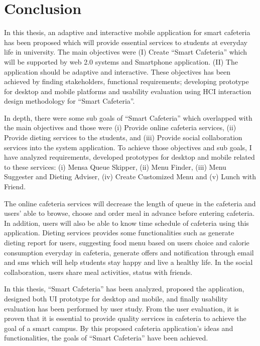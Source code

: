 \chapter{Conclusion}
\label{chap:Conclusion}
In this thesis, an adaptive and interactive mobile application for smart
cafeteria has been proposed which will provide essential services to students at
everyday life in university. The main objectives were (I) Create ``Smart
Cafeteria'' which will be supported by web 2.0 systems and Smartphone
application. (II) The application should be adaptive and interactive. These
objectives has been achieved by finding stakeholders, functional requirements;
developing prototype for desktop and mobile platforms and usability evaluation
using HCI interaction design methodology for ``Smart Cafeteria''.


In depth, there were some sub goals of ``Smart Cafeteria'' which overlapped with
the main objectives and those were (i) Provide online cafeteria services, (ii)
Provide dieting services to the students, and (iii) Provide social collaboration
services into the system application. To achieve those objectives and sub goals,
I have analyzed requirements, developed prototypes for desktop and mobile
related to these services: (i) Mensa Queue Skipper, (ii) Menu Finder, (iii) Menu
Suggester and Dieting Adviser, (iv) Create Customized Menu and (v) Lunch with
Friend.


The online cafeteria services will decrease the length of queue in the cafeteria
and users' able to browse, choose and order meal in advance before entering
cafeteria. In addition, users will also be able to know time schedule of
cafeteria using this application. Dieting services provides some functionalities
such as generate dieting report for users, suggesting food menu based on users
choice and calorie consumption everyday in cafeteria, generate offers and
notification through email and sms which will help students stay happy and live
a healthy life. In the social collaboration, users share meal activities, status
with friends.


In this thesis, ``Smart Cafeteria'' has been analyzed, proposed the application,
designed both UI prototype for desktop and mobile, and finally usability
evaluation has been performed by user study. From the user evaluation, it is
proven that it is essential to provide quality services in cafeteria to achieve
the goal of a smart campus. By this proposed cafeteria application's ideas and
functionalities, the goals of ``Smart Cafeteria'' have been achieved.


